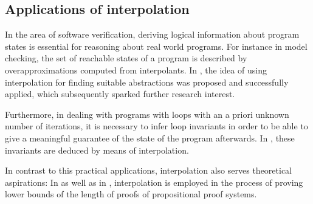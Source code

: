 \documentclass[,%
			paper=a4,%
			DIV10,
			liststotoc,
			bibtotoc,
			draft=false,%
			numbers=noendperiod
			]{scrartcl}
\begin{document}
\subsection{Applications of interpolation}
\label{application}

In the area of software verification, deriving logical information about program states is essential for reasoning about real world programs.
For instance in model checking, the set of reachable states of a program is described by overapproximations computed from interpolants.
In \cite{McMillan03}, the idea of using interpolation for finding suitable abstractions was proposed and successfully applied, which subsequently sparked further research interest. 

Furthermore, in dealing with programs with loops with an a priori unknown number of iterations, it is necessary to infer loop invariants in order to be able to give a meaningful guarantee of the state of the program afterwards.
In \cite{weissenbacher2010}, these invariants are deduced by means of interpolation.

In contrast to this practical applications, interpolation also serves theoretical aspirations: In \cite{Pudlak97} as well as in \cite{krajivcek1997interpolation}, interpolation is employed in the process of proving lower bounds of the length of proofs of propositional proof systems.


\begin{comment}
After decades of continued research, the area of software verification still lacks effective methods for reasoning about real world programs, which is necessary to prove vital safety or liveness properties.
The emergence of symbolic model checking and bounded model checking constitute considerable advances.
Here, the set of reachable states of a program are described by means of abstraction, i.e.\ automatically derived predicates overapproximate them.
However for actually finding suitable abstractions, sophisticated methods are required.


In recent years, the approach of applying Craig interpolation to solve both of these problems enjoyed increasing popularity, especially after successful applications for instance in \cite{McMillan03} for use in abstraction or \cite{weissenbacher2010} for use in loop invariant generation.


Another noteworthy and in fact one of the first interpolation algorithms of practical interest was introduced in \cite{McMillan03}, where it was also embedded in a model checking procedure.
\end{comment}
\end{document}
